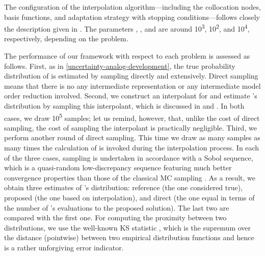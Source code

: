 The configuration of the interpolation algorithm---including the collocation
nodes, basis functions, and adaptation strategy with stopping
conditions---follows closely the description given in .
The parameters , , and  are around
10\textsuperscript{3}, 10\textsuperscript{2}, and 10\textsuperscript{4},
respectively, depending on the problem.

The performance of our framework with respect to each problem is assessed as
follows. First, as in \cref{uncertainty-analog-development}, the true
probability distribution of \g is estimated by sampling \g directly and
extensively. Direct sampling means that there is no any intermediate
representation or any intermediate model order reduction involved. Second, we
construct an interpolant for \g and estimate \g's distribution by sampling this
interpolant, which is discussed in  and
. In both cases, we draw 10\textsuperscript{5} samples;
let us remind, however, that, unlike the cost of direct sampling, the cost of
sampling the interpolant is practically negligible. Third, we perform another
round of direct sampling. This time we draw as many samples as many times the
calculation of \g is invoked during the interpolation process. In each of the
three cases, sampling is undertaken in accordance with a Sobol sequence, which
is a quasi-random low-discrepancy sequence featuring much better convergence
properties than those of the classical \ac{MC} sampling \cite{joe2008}. As a
result, we obtain three estimates of \g's distribution: reference (the one
considered true), proposed (the one based on interpolation), and direct (the one
equal in terms of the number of \g's evaluations to the proposed solution). The
last two are compared with the first one. For computing the proximity between
two distributions, we use the well-known \ac{KS} statistic \cite{rao2002}, which
is the supremum over the distance (pointwise) between two empirical distribution
functions and hence is a rather unforgiving error indicator.

